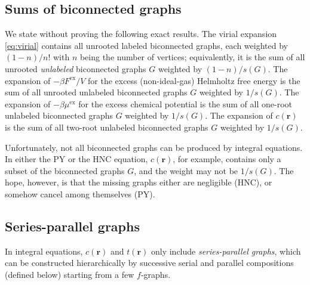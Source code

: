 \documentclass[aip,jcp,reprint,superscriptaddress]{revtex4-1}
\newcommand{\vct}[1]{\mathbf{#1}}
\providecommand{\vr}{} %
\renewcommand{\vr}{\vct{r}}
\newcommand{\supex}[1]{ { { #1 }^{ \mathrm{ex} } } }
\newcommand{\Fex}{\supex{F}}
\newcommand{\muex}{\supex{\mu}}
\begin{document}
\subsection{\label{sec:bcsums}Sums of biconnected graphs}

We state without proving the following exact results\cite{hansen, mayer, uhlenbeck1962}.
%
The virial expansion \eqref{eq:virial} contains
  all unrooted labeled biconnected graphs,
  each weighted by $(1-n)/n!$ with $n$ being the number of vertices;
%
equivalently, it is the sum of
  all unrooted \emph{unlabeled} biconnected graphs $G$
  weighted by $(1-n)/s(G)$.
%
The expansion of $-\beta \Fex/V$
  for the excess (non-ideal-gas) Helmholtz free energy
  is the sum of all unrooted unlabeled biconnected graphs $G$
  weighted by $1/s(G)$.
%
The expansion of $-\beta \muex$ for the excess chemical potential
  is the sum of all one-root unlabeled biconnected graphs $G$
  weighted by $1/s(G)$.
%
The expansion of $c(\vr)$ is the sum of
  all two-root unlabeled biconnected graphs $G$
  weighted by $1/s(G)$.
%

Unfortunately, not all biconnected graphs can be produced by integral equations.
%
In either the PY or the HNC equation,
  $c(\vr)$, for example, contains only a subset of the biconnected graphs $G$,
  and the weight may not be $1/s(G)$.
%
The hope, however, is that the missing graphs either are negligible (HNC),
  or somehow cancel among themselves (PY).





\subsection{Series-parallel graphs}



In integral equations,
  $c(\vr)$ and $t(\vr)$
  only include
  \emph{series-parallel graphs},
%
which can be constructed
  hierarchically by successive
  serial and parallel compositions (defined below)
  starting from a few $f$-graphs\cite{eppstein1992}.
\end{document}
